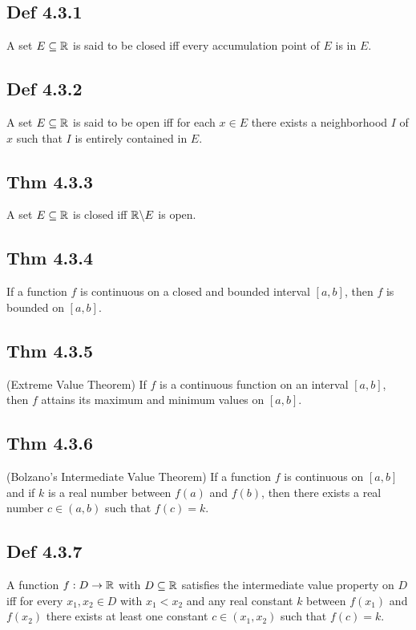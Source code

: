 \subsection*{Def 4.3.1}
    A set $E \subseteq \mathbb{R}$ is said to be closed iff every accumulation point of $E$ is in $E$.

\subsection*{Def 4.3.2}
    A set $E \subseteq \mathbb{R}$ is said to be open iff for each $x \in E$ there exists a neighborhood $I$ of $x$ such that $I$ is entirely contained in $E$.

\subsection*{Thm 4.3.3}
A set $E \subseteq \mathbb{R}$ is closed iff $\mathbb{R} \backslash E$ is open.

\subsection*{Thm 4.3.4}
    If a function $f$ is continuous on a closed and bounded interval $[a, b]$, then $f$ is bounded on $[a, b]$.

\subsection*{Thm 4.3.5}
    (Extreme Value Theorem) If $f$ is a continuous function on an interval $[a, b]$, then $f$ attains its maximum and minimum values on $[a , b]$.

\subsection*{Thm 4.3.6}
    (Bolzano's Intermediate Value Theorem) If a function $f$ is continuous on $[a, b]$ and if $k$ is a real number between $f(a)$ and $f(b)$, then there exists a real number $c \in  (a, b)$ such that $f(c) = k$.

\subsection*{Def 4.3.7}
    A function $f : D \to \mathbb{R}$ with $D \subseteq \mathbb{R}$ satisfies the intermediate value property on $D$ iff for every $x_1, x_2 \in D$ with $x_1 < x_2$ and any real constant $k$ between $f (x_1)$ and $f (x_2)$ there exists at least one constant $c \in (x_1, x_2)$ such that $f (c) = k$.

